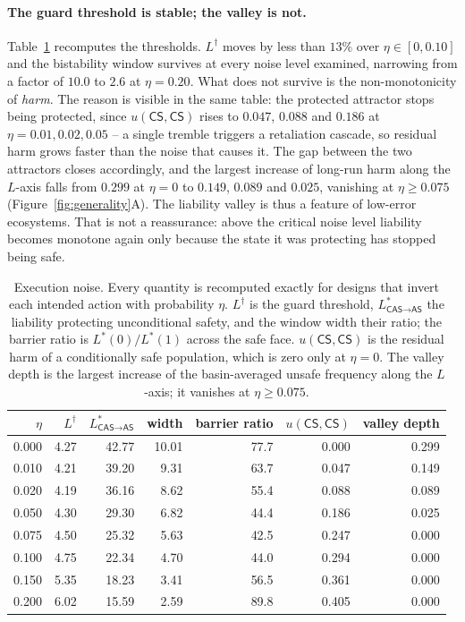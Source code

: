 \documentclass[pdflatex]{sn-jnl}
\theoremstyle{thmstyleone}
\theoremstyle{thmstylethree}
\theoremstyle{thmstyletwo}
\newcommand{\AS}{\textsf{AS}}
\newcommand{\CS}{\textsf{CS}}
\newcommand{\CAS}{\textsf{CAS}}
\begin{document}
\paragraph{The guard threshold is stable; the valley is not.}
Table~\ref{tab:noise} recomputes the thresholds. $L^{\dagger}$ moves by less
than $13\%$ over $\eta\in[0,0.10]$ and the bistability window survives at every
noise level examined, narrowing from a factor of $10.0$ to $2.6$ at
$\eta=0.20$. What does not survive is the non-monotonicity of \emph{harm}.
The reason is visible in the same table: the protected attractor stops being
protected, since $u(\CS,\CS)$ rises to $0.047$, $0.088$ and $0.186$ at
$\eta=0.01,0.02,0.05$ -- a single tremble triggers a retaliation cascade, so
residual harm grows faster than the noise that causes it. The gap between the
two attractors closes accordingly, and the largest increase of long-run harm
along the $L$-axis falls from $0.299$ at $\eta=0$ to $0.149$, $0.089$ and
$0.025$, vanishing at $\eta\ge0.075$ (Figure~\ref{fig:generality}A). The
liability valley is thus a feature of low-error ecosystems. That is not a
reassurance: above the critical noise level liability becomes monotone again
only because the state it was protecting has stopped being safe.

\begin{table}[!ht]
\centering
\caption{Execution noise. Every quantity is recomputed exactly for designs that invert each intended action with probability $\eta$. $L^{\dagger}$ is the guard threshold, $L^{*}_{\CAS\to\AS}$ the liability protecting unconditional safety, and the window width their ratio; the barrier ratio is $L^{*}(0)/L^{*}(1)$ across the safe face. $u(\CS,\CS)$ is the residual harm of a conditionally safe population, which is zero only at $\eta=0$. The valley depth is the largest increase of the basin-averaged unsafe frequency along the $L$-axis; it vanishes at $\eta\ge0.075$.}
\label{tab:noise}
\begin{tabular}{rrrrrrr}
\toprule
$\eta$ & $L^{\dagger}$ & $L^{*}_{\CAS\to\AS}$ & width & barrier ratio & $u(\CS,\CS)$ & valley depth \\
\midrule
0.000 & 4.27 & 42.77 & 10.01 & 77.7 & 0.000 & 0.299 \\
0.010 & 4.21 & 39.20 & 9.31 & 63.7 & 0.047 & 0.149 \\
0.020 & 4.19 & 36.16 & 8.62 & 55.4 & 0.088 & 0.089 \\
0.050 & 4.30 & 29.30 & 6.82 & 44.4 & 0.186 & 0.025 \\
0.075 & 4.50 & 25.32 & 5.63 & 42.5 & 0.247 & 0.000 \\
0.100 & 4.75 & 22.34 & 4.70 & 44.0 & 0.294 & 0.000 \\
0.150 & 5.35 & 18.23 & 3.41 & 56.5 & 0.361 & 0.000 \\
0.200 & 6.02 & 15.59 & 2.59 & 89.8 & 0.405 & 0.000 \\
\bottomrule
\end{tabular}
\end{table}
\end{document}
